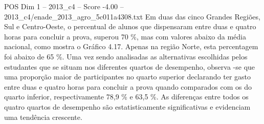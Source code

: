 \begin{textsample}{POS Dim 1 – 2013\_c4 – Score -4.00 – 2013\_c4/enade\_2013\_agro\_5c011a4308.txt}
Em duas das cinco Grandes Regiões, Sul e Centro-Oeste, o percentual de alunos que dispensaram entre duas e quatro horas para concluir a prova, superou 70 \%, mas com valores abaixo da média nacional, como mostra o Gráfico 4.17.
Apenas na região Norte, esta percentagem foi abaixo de 65 \%.
Uma vez sendo analisadas as alternativas escolhidas pelos estudantes que se situam nos diferentes quartos de desempenho, observa -se que uma proporção maior de participantes no quarto superior declarando ter gasto entre duas e quatro horas para concluir a prova quando comparados com os do quarto inferior, respectivamente 78,9 \% e 63,5 \%.
As diferenças entre todos os quatro quartos de desempenho são estatisticamente significativas e evidenciam uma tendência crescente.

\end{textsample}
